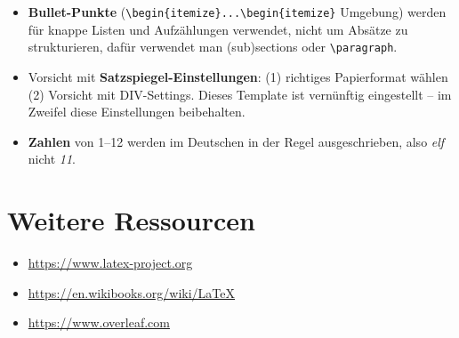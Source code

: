 \documentclass[twoside, a4paper, DIV=11, open=any, bibliography=totoc]{scrbook}
\begin{document}
\begin{itemize}
    \item \textbf{Bullet-Punkte} (\verb+\begin{itemize}...\begin{itemize}+ Umgebung) werden für knappe Listen und Aufzählungen verwendet, nicht um Absätze zu strukturieren, dafür verwendet man (sub)sections oder \verb+\paragraph+.
    \item Vorsicht mit \textbf{Satzspiegel-Einstellungen}: (1) richtiges Papierformat wählen (2) Vorsicht mit DIV-Settings. Dieses Template ist vernünftig eingestellt -- im Zweifel diese Einstellungen beibehalten.
    \item \textbf{Zahlen} von 1--12 werden im Deutschen in der Regel ausgeschrieben, also \textit{elf} nicht \textit{11}.
\end{itemize}


\section{Weitere Ressourcen} \label{sec:ressourcen}

\begin{itemize}
    \item \url{https://www.latex-project.org}
    \item \url{https://en.wikibooks.org/wiki/LaTeX}
    \item \url{https://www.overleaf.com}
\end{itemize}






\end{document}
